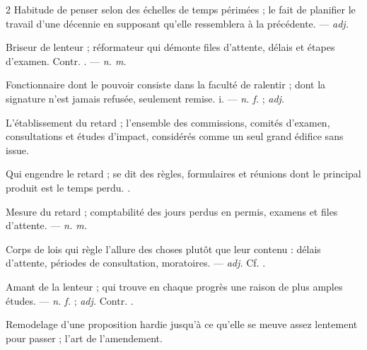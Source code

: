 \begin{multicols}{2}
 Habitude de penser selon des échelles de temps périmées ; le fait de planifier le travail d'une décennie en supposant qu'elle ressemblera à la précédente. —  \textit{adj.}

 Briseur de lenteur ; réformateur qui démonte files d'attente, délais et étapes d'examen. Contr. . —  \textit{n. m.}

 Fonctionnaire dont le pouvoir consiste dans la faculté de ralentir ; dont la signature n'est jamais refusée, seulement remise.   i. —  \textit{n. f.} ;  \textit{adj.}

  L'établissement du retard ; l'ensemble des commissions, comités d'examen, consultations et études d'impact, considérés comme un seul grand édifice sans issue.

 Qui engendre le retard ; se dit des règles, formulaires et réunions dont le principal produit est le temps perdu. .

 Mesure du retard ; comptabilité des jours perdus en permis, examens et files d'attente. —  \textit{n. m.}

 Corps de lois qui règle l'allure des choses plutôt que leur contenu : délais d'attente, périodes de consultation, moratoires. —  \textit{adj.} Cf. .

 Amant de la lenteur ; qui trouve en chaque progrès une raison de plus amples études. —  \textit{n. f.} ;  \textit{adj.} Contr. .

 Remodelage d'une proposition hardie jusqu'à ce qu'elle se meuve assez lentement pour passer ; l'art de l'amendement.  


\end{multicols}
